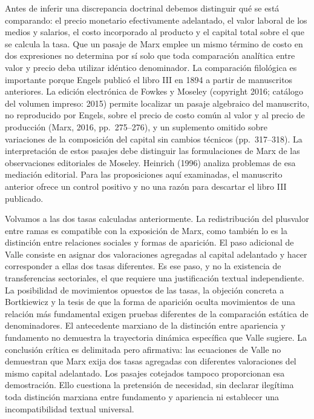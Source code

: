 \documentclass[10pt,twoside]{article}
\begin{document}
Antes de inferir una discrepancia doctrinal debemos distinguir qué se está comparando: el precio monetario efectivamente adelantado, el valor laboral de los medios y salarios, el costo incorporado al producto y el capital total sobre el que se calcula la tasa. Que un pasaje de Marx emplee un mismo término de costo en dos expresiones no determina por sí solo que toda comparación analítica entre valor y precio deba utilizar idéntico denominador. La comparación filológica es importante porque Engels publicó el libro III en 1894 a partir de manuscritos anteriores. La edición electrónica de Fowkes y Moseley (copyright 2016; catálogo del volumen impreso: 2015) permite localizar un pasaje algebraico del manuscrito, no reproducido por Engels, sobre el precio de costo común al valor y al precio de producción (Marx, 2016, pp.~275--276), y un suplemento omitido sobre variaciones de la composición del capital sin cambios técnicos (pp.~317--318). La interpretación de estos pasajes debe distinguir las formulaciones de Marx de las observaciones editoriales de Moseley. Heinrich (1996) analiza problemas de esa mediación editorial. Para las proposiciones aquí examinadas, el manuscrito anterior ofrece un control positivo y no una razón para descartar el libro III publicado.

Volvamos a las dos tasas calculadas anteriormente. La redistribución del plusvalor entre ramas es compatible con la exposición de Marx, como también lo es la distinción entre relaciones sociales y formas de aparición. El paso adicional de Valle consiste en asignar dos valoraciones agregadas al capital adelantado y hacer corresponder a ellas dos tasas diferentes. Es ese paso, y no la existencia de transferencias sectoriales, el que requiere una justificación textual independiente. La posibilidad de movimientos opuestos de las tasas, la objeción concreta a Bortkiewicz y la tesis de que la forma de aparición oculta movimientos de una relación más fundamental exigen pruebas diferentes de la comparación estática de denominadores. El antecedente marxiano de la distinción entre apariencia y fundamento no demuestra la trayectoria dinámica específica que Valle sugiere. La conclusión crítica es delimitada pero afirmativa: las ecuaciones de Valle no demuestran que Marx exija dos tasas agregadas con diferentes valoraciones del mismo capital adelantado. Los pasajes cotejados tampoco proporcionan esa demostración. Ello cuestiona la pretensión de necesidad, sin declarar ilegítima toda distinción marxiana entre fundamento y apariencia ni establecer una incompatibilidad textual universal.
\end{document}
